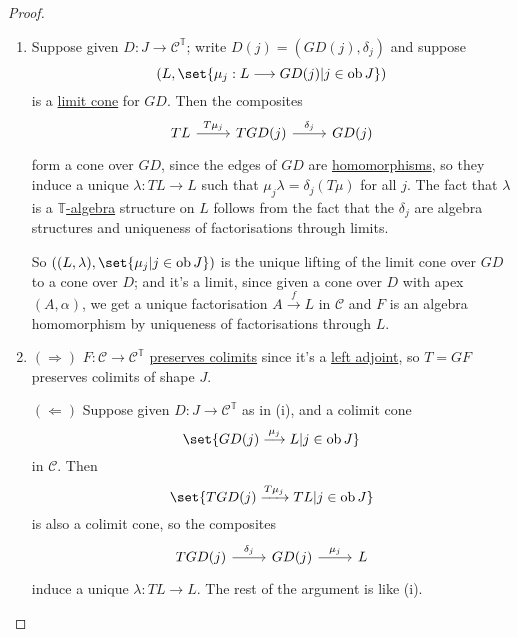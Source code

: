 \documentclass{article}
\DeclareMathOperator{\ob}{ob}
\let\to\longrightarrow
\begin{document}
\begin{proof}\leavevmode
  \begin{enumerate}[label=(\roman*)]
    \item Suppose given $D: J \to \mathscr{C}^\mathbb{T}$; write $D(j) = (GD(j), \delta_j)$ and suppose
      \begin{equation*}(L, \set{\mu_j: L \to GD(j) | j \in \ob J})\end{equation*}
      is a \hyperlink{def:limit}{limit cone} for $GD$.
      Then the composites
      \begin{equation*}
        \begin{tikzcd}
          TL \rar{T\mu_j} & TGD(j) \rar{\delta_j} & GD(j)
        \end{tikzcd}
      \end{equation*}
      form a cone over $GD$, since the edges of $GD$ are \hyperlink{def:em}{homomorphisms}, so they induce a unique $\lambda: TL \to L$ such that $\mu_j \lambda = \delta_j(T\mu)$ for all $j$.
      The fact that $\lambda$ is a \hyperlink{def:em}{$\mathbb{T}$-algebra} structure on $L$ follows from the fact that the $\delta_j$ are algebra structures and uniqueness of factorisations through limits.

      So $((L,\lambda), \set{\mu_j | j \in \ob J})$ is the unique lifting of the limit cone over $GD$ to a cone over $D$; and it's a limit, since given a cone over $D$ with apex $(A, \alpha)$, we get a unique factorisation $A \overset{f}\to L$ in $\mathscr{C}$ and $F$ is an algebra homomorphism by uniqueness of factorisations through $L$.

    \item $(\Rightarrow)$ $F: \mathscr{C} \to \mathscr{C}^\mathbb{T}$ \hyperlink{def:plim}{preserves colimits} since it's a \hyperlink{def:adj}{left adjoint}, so $T = GF$ preserves colimits of shape $J$.

      $(\Leftarrow)$ Suppose given $D: J \to \mathscr{C}^\mathbb{T}$ as in (i), and a colimit cone
      \begin{equation*}
        \set{GD(j) \overset{\mu_j}\to L | j \in \ob J}
      \end{equation*}
      in $\mathscr{C}$.
      Then
      \begin{equation*}
        \set{TGD(j) \xrightarrow{T\mu_j} TL | j \in \ob J}
      \end{equation*}
      is also a colimit cone, so the composites
      \begin{equation*}
        \begin{tikzcd}
          TGD(j) \rar{\delta_j} & GD(j) \rar{\mu_j}& L
        \end{tikzcd}
      \end{equation*}
      induce a unique $\lambda: TL \to L$.
      The rest of the argument is like (i). \qedhere
  \end{enumerate}
\end{proof}
\end{document}

